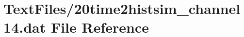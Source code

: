 \hypertarget{20time2histsim__channel14_8dat}{}\section{Text\+Files/20time2histsim\+\_\+channel14.dat File Reference}
\label{20time2histsim__channel14_8dat}
